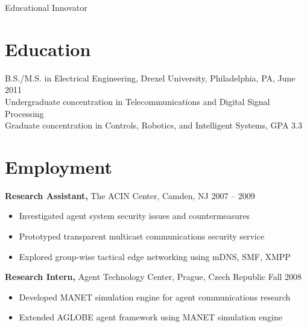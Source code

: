 \documentclass[margin]{res}
\begin{document}
\begin{resume}
\begin{educate}
Educational Innovator
\end{educate}

\section{Education} 
B.S./M.S. in Electrical Engineering, Drexel University, Philadelphia, PA, June 2011 \\
Undergraduate concentration in Telecommunications and Digital Signal Processing \\
Graduate concentration in Controls, Robotics, and Intelligent Systems, GPA 3.3 

\section{Employment}
 {\bf Research Assistant,} The ACIN Center, Camden, NJ \hfill 2007 -- 2009
 \begin{itemize} \itemsep -2pt  %
 \item Investigated agent system security issues and countermeasures 
 \item Prototyped transparent multicast communications security service 
\item Explored group-wise tactical edge networking using mDNS, SMF, XMPP 
 \end{itemize}

{\bf Research Intern,} Agent Technology Center, Prague, Czech Republic \hfill  Fall 2008
\begin{itemize} \itemsep -2pt %
\item Developed MANET simulation engine for agent communications research
\item Extended AGLOBE agent framework using MANET simulation engine 
\end{itemize}


\end{resume}
\end{document}
